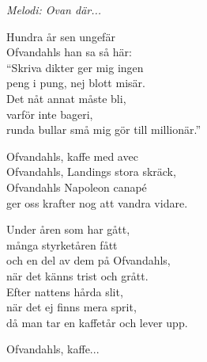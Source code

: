 {\footnotesize\textit{Melodi: Ovan där...}}\par
\vspace{10pt}
Hundra år sen ungefär\\
Ofvandahls han sa så här:\\
``Skriva dikter ger mig ingen\\
peng i pung, nej blott misär.\\
Det nåt annat måste bli,\\
varför inte bageri,\\
runda bullar små mig gör till millionär.''\par
\vspace{10pt}
Ofvandahls, kaffe med avec\\
Ofvandahls, Landings stora skräck,\\
Ofvandahls Napoleon canapé\\
ger oss krafter nog att vandra vidare.\par
\vspace{10pt}
Under åren som har gått,\\
många styrketåren fått\\
och en del av dem på Ofvandahls,\\
när det känns trist och grått.\\
Efter nattens hårda slit, \\
när det ej finns mera sprit,\\
då man tar en kaffetår och lever upp.\par
\vspace{10pt}
Ofvandahls, kaffe...
